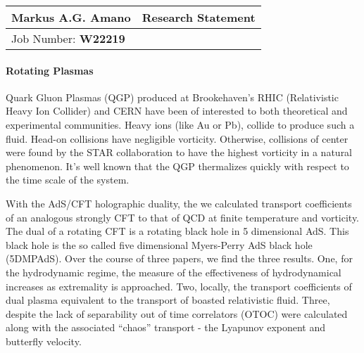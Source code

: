 \documentclass[12pt]{article}
\begin{document}
\begin{center}
  \begin{tabularx}{\textwidth} { 
      >{\raggedright\arraybackslash}X 
    >{\raggedleft\arraybackslash}X  }
    \huge Markus A.G. Amano & Research Statement\\
    \hline
    Job Number: \textbf{W22219} & \\
  \end{tabularx}
\end{center}


\paragraph{Rotating Plasmas}

Quark Gluon Plasmas (QGP) produced at Brookehaven's RHIC (Relativistic Heavy Ion Collider) and CERN have been of interested to both theoretical and experimental communities.
Heavy ions (like Au or Pb), collide to produce such a fluid.
Head-on collisions have negligible vorticity.
Otherwise, collisions of center were found by the STAR collaboration to have the highest vorticity in a natural phenomenon.
It's well known that the QGP thermalizes quickly with respect to the time scale of the system.

With the AdS/CFT holographic duality, the we calculated transport coefficients of an analogous strongly CFT to that of QCD at finite temperature and vorticity.
The dual of a rotating CFT is a rotating black hole in 5 dimensional AdS. 
This black hole is the so called five dimensional Myers-Perry AdS black hole (5DMPAdS).
Over the course of three papers, we find the three results. 
One, for the hydrodynamic regime, the measure of the effectiveness of hydrodynamical increases as extremality is approached.
Two, locally, the transport coefficients of dual plasma equivalent to the transport of boasted relativistic fluid.
Three, despite the lack of separability out of time correlators (OTOC) were calculated along with the associated ``chaos'' transport - the Lyapunov exponent and butterfly velocity.
\end{document}
